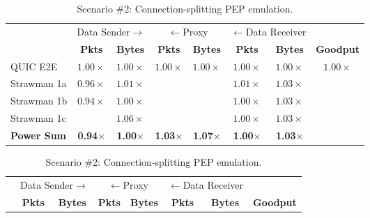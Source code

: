\begin{table}[ht]
\begin{subtable}{\columnwidth}
  \setlength{\tabcolsep}{2pt}
  \centering
  \begin{tabular}{lccccccc}
    \toprule
    & \multicolumn{2}{c}{Data Sender$\rightarrow$} & \multicolumn{2}{c}{$\leftarrow$Proxy} & \multicolumn{2}{c}{$\leftarrow$Data Receiver} & \\
    & \bf Pkts & \bf Bytes & \bf Pkts & \bf Bytes & \bf Pkts & \bf Bytes & \bf Goodput \\
    \midrule
    QUIC E2E & $1.00\times$ & $1.00\times$ & $1.00\times$ & $1.00\times$ & $1.00\times$ & $1.00\times$ & $1.00\times$ \\
    Strawman 1a & $0.96\times$ & $1.01\times$ & \cellcolor{LighterRed}{$2.02\times$} & \cellcolor{LightestRed}{$1.56\times$} & $1.01\times$ & $1.03\times$ & \cellcolor{LighterGreen}{$3.33\times$} \\
    Strawman 1b & $0.94\times$ & $1.00\times$ & \cellcolor{LighterRed}{$2.00\times$} & \cellcolor{LightestRed}{$1.78\times$} & $1.00\times$ & $1.03\times$ & \cellcolor{LightGreen}{$3.53\times$} \\
    Strawman 1c & \cellcolor{LightestRed}{$1.83\times$} & $1.06\times$ & \cellcolor{LighterRed}{$2.01\times$} & \cellcolor{LightestRed}{$1.83\times$} & $1.00\times$ & $1.03\times$ & \cellcolor{LightGreen}{$3.46\times$} \\
    \bf \textcolor{black!50!blue}{Power Sum}   & \textcolor{black!50!blue}{\bf 0.94$\times$} & \textcolor{black!50!blue}{\bf 1.00$\times$} & \textcolor{black!50!blue}{\bf 1.03$\times$} & \textcolor{black!50!blue}{\bf 1.07$\times$} & \textcolor{black!50!blue}{\bf 1.00$\times$} & \textcolor{black!50!blue}{\bf 1.03$\times$} & \cellcolor{LightGreen}{\textcolor{black!50!blue}{\bf 3.55$\times$}} \\
    \bottomrule
  \end{tabular}
  \caption{Scenario \#2: Connection-splitting PEP emulation.\\}
  \label{tab:sidekick:packet-overheads:retx}
\end{subtable}
\begin{subtable}{\columnwidth}
  \setlength{\tabcolsep}{2pt}
  \centering
  \begin{tabular}{lccccccc}
    \toprule
    & \multicolumn{2}{c}{Data Sender$\rightarrow$} & \multicolumn{2}{c}{$\leftarrow$Proxy} & \multicolumn{2}{c}{$\leftarrow$Data Receiver} & \\
    & \bf Pkts & \bf Bytes & \bf Pkts & \bf Bytes & \bf Pkts & \bf Bytes & \bf Goodput \\

\end{tabular}
\end{subtable}
\end{table}
